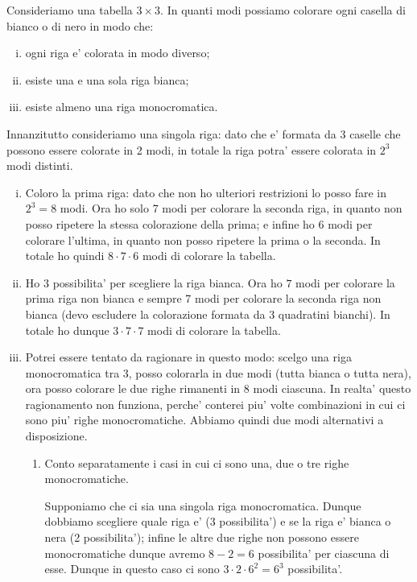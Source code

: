 \begin{example}
    Consideriamo una tabella $3 \times 3$. In quanti modi possiamo colorare ogni casella di bianco o di nero in modo che:
    \begin{enumerate}[(i)]
        \item ogni riga e' colorata in modo diverso;
        \item esiste una e una sola riga bianca;
        \item esiste almeno una riga monocromatica.
    \end{enumerate}
\end{example}
\begin{solution}
    Innanzitutto consideriamo una singola riga: dato che e' formata da $3$ caselle che possono essere colorate in 2 modi, in totale la riga potra' essere colorata in $2^3$ modi distinti.
    \begin{enumerate}
        [(i)]
        \item Coloro la prima riga: dato che non ho ulteriori restrizioni lo posso fare in $2^3 = 8$ modi. Ora ho solo 7 modi per colorare la seconda riga, in quanto non posso ripetere la stessa colorazione della prima; e infine ho 6 modi per colorare l'ultima, in quanto non posso ripetere la prima o la seconda. In totale ho quindi $8\cdot 7\cdot 6$ modi di colorare la tabella.
        \item Ho $3$ possibilita' per scegliere la riga bianca. Ora ho $7$ modi per colorare la prima riga non bianca e sempre 7 modi per colorare la seconda riga non bianca (devo escludere la colorazione formata da 3 quadratini bianchi). In totale ho dunque $3 \cdot 7\cdot 7$ modi di colorare la tabella.
        \item Potrei essere tentato da ragionare in questo modo: scelgo una riga monocromatica tra 3, posso colorarla in due modi (tutta bianca o tutta nera), ora posso colorare le due righe rimanenti in 8 modi ciascuna. In realta' questo ragionamento non funziona, perche' conterei piu' volte combinazioni in cui ci sono piu' righe monocromatiche.
        Abbiamo quindi due modi alternativi a disposizione. \begin{enumerate}[1.]
            \item Conto separatamente i casi in cui ci sono una, due o tre righe monocromatiche.
            
            Supponiamo che ci sia una singola riga monocromatica. Dunque dobbiamo scegliere quale riga e' (3 possibilita') e se la riga e' bianca o nera (2 possibilita'); infine le altre due righe non possono essere monocromatiche dunque avremo $8-2 = 6$ possibilita' per ciascuna di esse. Dunque in questo caso ci sono $3\cdot 2 \cdot 6^2 = 6^3$ possibilita'.


\end{enumerate}
\end{enumerate}
\end{solution}
